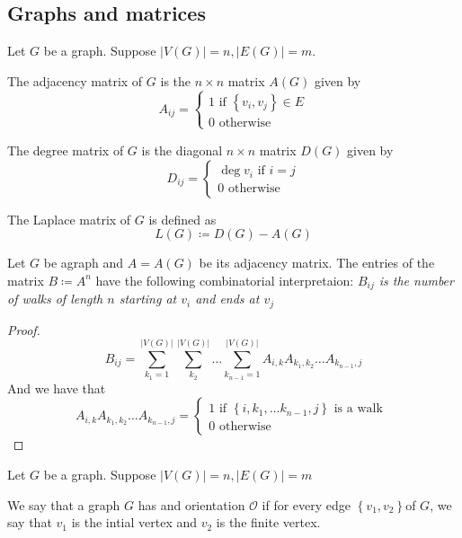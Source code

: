 \documentclass[../main.tex]{subfiles}
\begin{document}
\subsection{Graphs and matrices}
Let $G$ be a graph. Suppose $|V( G) | = n, |E( G)| =m$.\\
\begin{defn}
	The adjacency matrix of $G$ is the $n \times n $ matrix $A( G) $ given by
	\[ 
	A_{ij } = 
	\begin{cases}
	1 \text{ if }  \left\{ v_i, v_j \right\} \in E\\
	0 \text{ otherwise } 
	\end{cases}
	\]
	
\end{defn}	
\begin{defn}
	The degree matrix of $G$ is the diagonal $n\times n$ matrix $D( G) $ given by
	\[ 
	D_{ij} =
	\begin{cases}
	\deg v_i \text{ if  } i=j\\
	0 \text{ otherwise } 
	\end{cases}
	\]
	
\end{defn}
\begin{defn}
	The Laplace matrix of $G$ is defined as
	\[ 
		L( G) \coloneqq D( G) -A( G) 
	\]
\end{defn}
\begin{lemma}
	Let $G$ be agraph and $A=A( G) $ be its adjacency matrix. The entries of the matrix $B \coloneqq  A^{n}$ have the following combinatorial interpretaion:
	\textit { $B_{ij} $ is the number of walks of length $n$ starting at $v_i$ and ends at $v_j$} 
\end{lemma}
\begin{proof}
\[ 
	B_{ij} = \sum_{k_1=1}^{ |V( G) |} \sum_{k_2}^{ |V( G) |}\ldots \sum_{k_{n-1} =1}^{ |V( G)| } A_{i,k} A_{k_1,k_2} \ldots A_{k_{n-1} ,j} 
\]
And we have that
\[ 
A_{i,k} A_{k_1,k_2} \ldots A_{k_{n-1} ,j}  =
\begin{cases}
1 \text{ if } \left\{ i, k_1, \ldots k_{n-1} ,j \right\} \text{ is a walk } \\
0 \text{ otherwise } 
\end{cases}
\]


\end{proof}
Let $G$ be a graph. Suppose $|V( G) | = n, |E( G) | = m$
\begin{defn}[orientation]
	We say that a graph $G$ has and orientation $ \mathcal{O}$ if for every edge $ \left\{ v_1,v_2 \right\} $of $G$, we say that $v_1$ is the intial vertex and $v_2$ is the finite vertex.
\end{defn}
\end{document}
